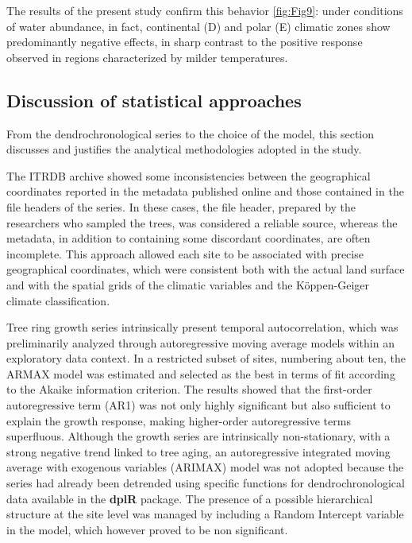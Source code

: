 \documentclass[12pt, a4paper]{article}
\begin{document}
The results of the present study confirm this behavior \cref{fig:Fig9}: under conditions of water abundance, in fact, continental (D) and polar (E) climatic zones show predominantly negative effects, in sharp contrast to the positive response observed in regions characterized by milder temperatures.


\subsection{Discussion of statistical approaches}

From the dendrochronological series to the choice of the model, this section discusses and justifies the analytical methodologies adopted in the study.

The ITRDB archive showed some inconsistencies between the geographical coordinates reported in the metadata published online and those contained in the file headers of the series. In these cases, the file header, prepared by the researchers who sampled the trees, was considered a reliable source, whereas the metadata, in addition to containing some discordant coordinates, are often incomplete. This approach allowed each site to be associated with precise geographical coordinates, which were consistent both with the actual land surface and with the spatial grids of the climatic variables and the Köppen-Geiger climate classification.

Tree ring growth series intrinsically present temporal autocorrelation, which was preliminarily analyzed through autoregressive moving average models within an exploratory data context. In a restricted subset of sites, numbering about ten, the ARMAX model was estimated and selected as the best in terms of fit according to the Akaike information criterion. The results showed that the first-order autoregressive term (AR1) was not only highly significant but also sufficient to explain the growth response, making higher-order autoregressive terms superfluous. Although the growth series are intrinsically non-stationary, with a strong negative trend linked to tree aging, an autoregressive integrated moving average with exogenous variables (ARIMAX) model was not adopted because the series had already been detrended using specific functions for dendrochronological data available in the \textbf{dplR} package. The presence of a possible hierarchical structure at the site level was managed by including a Random Intercept variable in the model, which however proved to be non significant.
\end{document}
